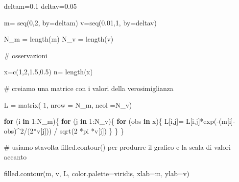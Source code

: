 \documentclass[
  italian,
  letterpaper,
]{book}
\newenvironment{Shaded}{\begin{snugshade}}{\end{snugshade}}
\newcommand{\AttributeTok}[1]{\textcolor[rgb]{0.40,0.45,0.13}{#1}}
\newcommand{\CommentTok}[1]{\textcolor[rgb]{0.37,0.37,0.37}{#1}}
\newcommand{\ControlFlowTok}[1]{\textcolor[rgb]{0.00,0.23,0.31}{\textbf{#1}}}
\newcommand{\DecValTok}[1]{\textcolor[rgb]{0.68,0.00,0.00}{#1}}
\newcommand{\FloatTok}[1]{\textcolor[rgb]{0.68,0.00,0.00}{#1}}
\newcommand{\FunctionTok}[1]{\textcolor[rgb]{0.28,0.35,0.67}{#1}}
\newcommand{\NormalTok}[1]{\textcolor[rgb]{0.00,0.23,0.31}{#1}}
\newcommand{\OtherTok}[1]{\textcolor[rgb]{0.00,0.23,0.31}{#1}}
\newcommand{\SpecialCharTok}[1]{\textcolor[rgb]{0.37,0.37,0.37}{#1}}
\newcommand{\StringTok}[1]{\textcolor[rgb]{0.13,0.47,0.30}{#1}}
\theoremstyle{definition}
\theoremstyle{remark}
\begin{document}
\begin{Shaded}
\begin{Highlighting}[]
\NormalTok{deltam}\OtherTok{=}\FloatTok{0.1}
\NormalTok{deltav}\OtherTok{=}\FloatTok{0.05}

\NormalTok{m}\OtherTok{=} \FunctionTok{seq}\NormalTok{(}\DecValTok{0}\NormalTok{,}\DecValTok{2}\NormalTok{, }\AttributeTok{by=}\NormalTok{deltam)}
\NormalTok{v}\OtherTok{=}\FunctionTok{seq}\NormalTok{(}\FloatTok{0.01}\NormalTok{,}\DecValTok{1}\NormalTok{, }\AttributeTok{by=}\NormalTok{deltav)}

\NormalTok{N\_m }\OtherTok{=} \FunctionTok{length}\NormalTok{(m)}
\NormalTok{N\_v }\OtherTok{=} \FunctionTok{length}\NormalTok{(v)}

\CommentTok{\# osservazioni}

\NormalTok{x}\OtherTok{=}\FunctionTok{c}\NormalTok{(}\DecValTok{1}\NormalTok{,}\DecValTok{2}\NormalTok{,}\FloatTok{1.5}\NormalTok{,}\FloatTok{0.5}\NormalTok{)}
\NormalTok{n}\OtherTok{=} \FunctionTok{length}\NormalTok{(x)}


\CommentTok{\# creiamo una matrice con i valori della verosimiglianza}

\NormalTok{L }\OtherTok{=} \FunctionTok{matrix}\NormalTok{( }\DecValTok{1}\NormalTok{, }\AttributeTok{nrow =}\NormalTok{ N\_m, }\AttributeTok{ncol =}\NormalTok{N\_v)}

\ControlFlowTok{for}\NormalTok{ (i }\ControlFlowTok{in} \DecValTok{1}\SpecialCharTok{:}\NormalTok{N\_m)\{}
  \ControlFlowTok{for}\NormalTok{ (j }\ControlFlowTok{in} \DecValTok{1}\SpecialCharTok{:}\NormalTok{N\_v)\{}
    \ControlFlowTok{for}\NormalTok{ (obs }\ControlFlowTok{in}\NormalTok{ x)\{}
\NormalTok{      L[i,j]}\OtherTok{=}\NormalTok{ L[i,j]}\SpecialCharTok{*}\FunctionTok{exp}\NormalTok{(}\SpecialCharTok{{-}}\NormalTok{(m[i]}\SpecialCharTok{{-}}\NormalTok{obs)}\SpecialCharTok{\^{}}\DecValTok{2}\SpecialCharTok{/}\NormalTok{(}\DecValTok{2}\SpecialCharTok{*}\NormalTok{v[j])) }\SpecialCharTok{/} \FunctionTok{sqrt}\NormalTok{(}\DecValTok{2} \SpecialCharTok{*}\NormalTok{pi }\SpecialCharTok{*}\NormalTok{v[j])}
\NormalTok{    \}}
\NormalTok{  \}}
\NormalTok{\}}

\CommentTok{\# usiamo stavolta filled.contour() per produrre il grafico e la scala di valori accanto}

\FunctionTok{filled.contour}\NormalTok{(m, v, L, }\AttributeTok{color.palette=}\NormalTok{viridis, }\AttributeTok{xlab=}\StringTok{\textquotesingle{}m\textquotesingle{}}\NormalTok{, }\AttributeTok{ylab=}\StringTok{\textquotesingle{}v\textquotesingle{}}\NormalTok{)}
\end{Highlighting}
\end{Shaded}
\end{document}

